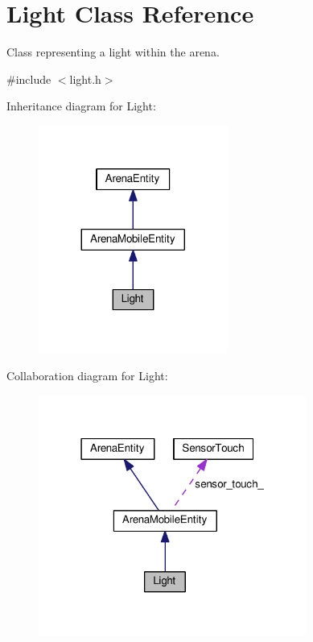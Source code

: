 \hypertarget{classLight}{}\section{Light Class Reference}
\label{classLight}


Class representing a light within the arena.  




{\ttfamily \#include $<$light.\+h$>$}



Inheritance diagram for Light\+:\nopagebreak
\begin{figure}[H]
\begin{center}
\leavevmode
\includegraphics[width=176pt]{classLight__inherit__graph}
\end{center}
\end{figure}


Collaboration diagram for Light\+:\nopagebreak
\begin{figure}[H]
\begin{center}
\leavevmode
\includegraphics[width=250pt]{classLight__coll__graph}
\end{center}
\end{figure}
